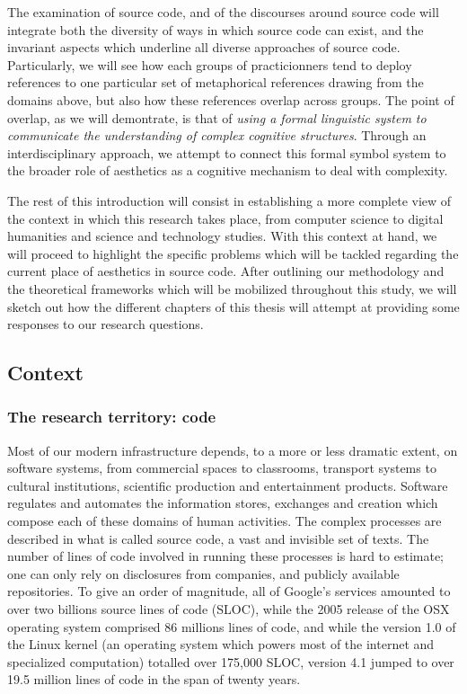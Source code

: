 The examination of source code, and of the discourses around source code will integrate both the diversity of ways in which source code can exist, and the invariant aspects which underline all diverse approaches of source code. Particularly, we will see how each groups of practicionners tend to deploy references to one particular set of metaphorical references drawing from the domains above, but also how these references overlap across groups. The point of overlap, as we will demontrate, is that of \emph{using a formal linguistic system to communicate the understanding of complex cognitive structures}. Through an interdisciplinary approach, we attempt to connect this formal symbol system to the broader role of aesthetics as a cognitive mechanism to deal with complexity.

The rest of this introduction will consist in establishing a more complete view of the context in which this research takes place, from computer science to digital humanities and science and technology studies. With this context at hand, we will proceed to highlight the specific problems which will be tackled regarding the current place of aesthetics in source code. After outlining our methodology and the theoretical frameworks which will be mobilized throughout this study, we will sketch out how the different chapters of this thesis will attempt at providing some responses to our research questions.

\subsection{Context}

\subsubsection{The research territory: code}

Most of our modern infrastructure depends, to a more or less dramatic extent, on software systems\cite{kitchin_codespace_2011}, from commercial spaces to classrooms, transport systems to cultural institutions, scientific production and entertainment products. Software regulates and automates the information stores, exchanges and creation which compose each of these domains of human activities.  The complex processes are described in what is called source code, a vast and invisible set of texts. The number of lines of code involved in running these processes is hard to estimate; one can only rely on disclosures from companies, and publicly available repositories. To give an order of magnitude, all of Google's services amounted to over two billions source lines of code (SLOC)\cite{scale_why_2015}, while the 2005 release of the OSX operating system comprised 86 millions lines of code, and while the version 1.0 of the Linux kernel (an operating system which powers most of the internet and specialized computation) totalled over 175,000 SLOC, version 4.1 jumped to over 19.5 million lines of code in the span of twenty years\cite{noauthor_linux_2021}.

